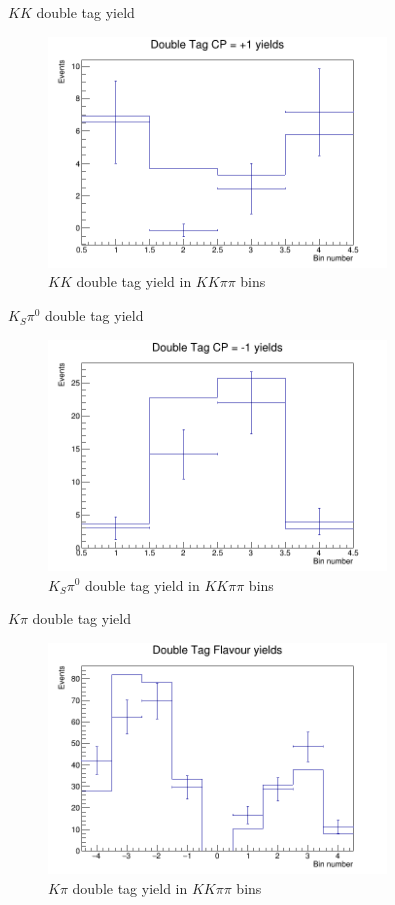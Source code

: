 \documentclass{beamer}
\begin{document}
\begin{frame}{$KK$ double tag yield}
  \begin{figure}
    \centering
    \includegraphics[width=0.8\textwidth]{DoubleTagYieldCPEven.png}
    \caption{$KK$ double tag yield in $KK\pi\pi$ bins}
  \end{figure}
\end{frame}

\begin{frame}{$K_S\pi^0$ double tag yield}
  \begin{figure}
    \centering
    \includegraphics[width=0.8\textwidth]{DoubleTagYieldCPOdd.png}
    \caption{$K_S\pi^0$ double tag yield in $KK\pi\pi$ bins}
  \end{figure}
\end{frame}

\begin{frame}{$K\pi$ double tag yield}
  \begin{figure}
    \centering
    \includegraphics[width=0.8\textwidth]{DoubleTagYieldFlavour.png}
    \caption{$K\pi$ double tag yield in $KK\pi\pi$ bins}
  \end{figure}
\end{frame}
\end{document}
